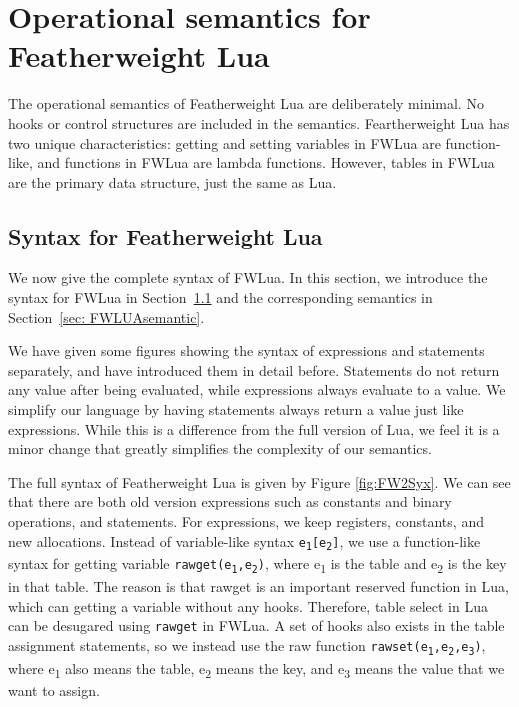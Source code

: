 \chapter{Operational semantics for Featherweight Lua} \label{chp: syntax and semantic}
The operational semantics of Featherweight Lua are deliberately minimal. No hooks or control structures are included in the semantics. Feartherweight Lua has two unique characteristics:
getting and setting variables in FWLua are function-like, and functions in FWLua are lambda functions.
However, tables in FWLua are the primary data structure, just the same as Lua.

\section{Syntax for Featherweight Lua}\label{sec: FWLUAsyntax}
We now give the complete syntax of FWLua. In this section, we introduce the syntax for FWLua in Section~\ref{sec: FWLUAsyntax} and the corresponding semantics in Section~\ref{sec: FWLUAsemantic}.

We have given some figures showing the syntax of expressions and statements separately, and have introduced them in detail before.
Statements do not return any value after being evaluated, while expressions always evaluate to a value.
We simplify our language by
having statements always return a value just like expressions.
While this is a difference from the full version of Lua,
we feel it is a minor change that greatly simplifies the complexity
of our semantics.

The full syntax of Featherweight Lua is given by Figure \ref{fig:FW2Syx}. We can see that there are both old version expressions such as constants and binary operations, and statements. For expressions, we keep registers, constants, and new allocations.
Instead of variable-like syntax {\tt e\textsubscript{1}[e\textsubscript{2}]}, we use a function-like syntax for getting variable {\tt rawget(e\textsubscript{1},e\textsubscript{2})}, where e\textsubscript{1} is the table and e\textsubscript{2} is the key in that table. The reason is that rawget is an important reserved function in Lua, which can getting a variable without any hooks. Therefore, table select in Lua can be desugared using {\tt rawget} in FWLua.
A set of hooks also exists in the table assignment statements, so we instead use the raw function {\tt rawset(e\textsubscript{1},e\textsubscript{2},e\textsubscript{3})}, where e\textsubscript{1} also means the table, e\textsubscript{2} means the key, and e\textsubscript{3} means the value that we want to assign.

